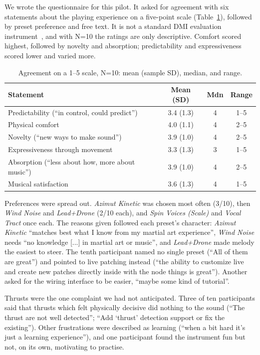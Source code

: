 \documentclass[sigconf,nonacm]{acmart}
\newcommand{\preset}[1]{\textit{#1}}
\begin{document}
We wrote the questionnaire for this pilot. It asked for agreement with six statements about the
playing experience on a five-point scale (Table~\ref{tab:pilot}), followed by preset preference and
free text. It is not a standard DMI evaluation instrument~\cite{wanderley2002evaluation,omodhrain2011framework},
and with N=10 the ratings are only descriptive. Comfort scored highest, followed by novelty and
absorption; predictability and expressiveness scored lower and varied more.

\begin{table}[htbp]
\centering
\small
\caption{Agreement on a 1--5 scale, N=10: mean (sample SD), median, and range.}
\label{tab:pilot}
\begin{tabular}{@{}lccc@{}}
\toprule
Statement & Mean (SD) & Mdn & Range \\
\midrule
Predictability (``in control, could predict'') & 3.4 (1.3) & 4 & 1--5 \\
Physical comfort & 4.0 (1.1) & 4 & 2--5 \\
Novelty (``new ways to make sound'') & 3.9 (1.0) & 4 & 2--5 \\
Expressiveness through movement & 3.3 (1.3) & 3 & 1--5 \\
Absorption (``less about how, more about music'') & 3.9 (1.0) & 4 & 2--5 \\
Musical satisfaction & 3.6 (1.3) & 4 & 1--5 \\
\bottomrule
\end{tabular}
\end{table}

Preferences were spread out. \preset{Azimut Kinetic} was chosen most often (3/10), then
\preset{Wind Noise} and \preset{Lead+Drone} (2/10 each), and \preset{Spin Voices (Scale)} and
\preset{Vocal Tract} once each. The reasons given followed each preset's character:
\preset{Azimut Kinetic} ``matches best what I know from my martial art experience'', \preset{Wind
Noise} needs ``no knowledge [...] in martial art or music'', and \preset{Lead+Drone} made melody the
easiest to steer. The tenth participant named no single preset (``All of them are great'') and
pointed to live patching instead (``the ability to customize live and create new patches directly
inside with the node things is great''). Another asked for the wiring interface to be easier,
``maybe some kind of tutorial''.

Thrusts were the one complaint we had not anticipated. Three of ten participants said that thrusts
which felt physically decisive did nothing to the sound (``The thrust are not well detected'';
``Add `thrust' detection support or fix the existing''). Other frustrations were described as
learning (``when a bit hard it's just a learning experience''), and one participant found the
instrument fun but not, on its own, motivating to practise.
\end{document}
